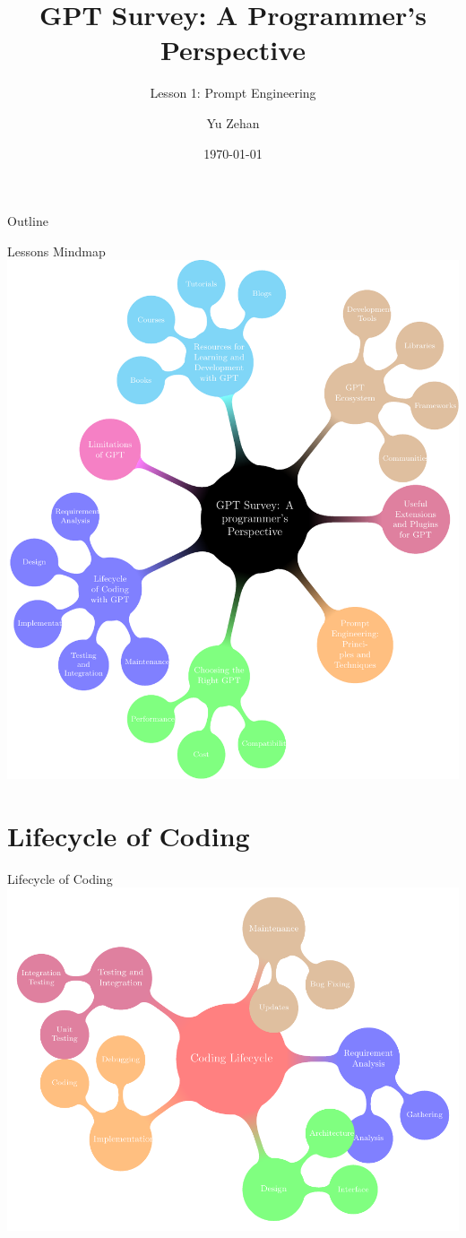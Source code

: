 \documentclass{beamer}
\title{GPT Survey: A Programmer's Perspective}
\subtitle{Lesson 1: Prompt Engineering}
\author{Yu Zehan}
\institute{Intel FLEX}
\date{\today}
\begin{document}
\begin{frame}
  \titlepage
\end{frame}

\begin{frame}{Outline}
  \tableofcontents
\end{frame}

\begin{frame}{Lessons Mindmap}
  \includegraphics[width=\textwidth,height=\textheight,keepaspectratio]{tikz-lessons-mindmap.pdf}
\end{frame}

\section{Lifecycle of Coding}
\begin{frame}{Lifecycle of Coding}
  \includegraphics[width=\textwidth,height=\textheight,keepaspectratio]{tikz-code-lifecycle.pdf}
\end{frame}
\end{document}
